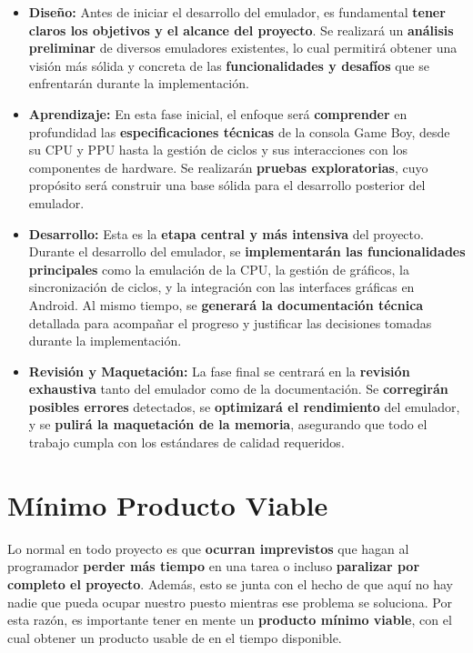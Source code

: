 \begin{itemize}
	\item \textbf{Diseño:} Antes de iniciar el desarrollo del emulador, es fundamental \textbf{tener claros los objetivos y el alcance del proyecto}. Se realizará un \textbf{análisis preliminar} de diversos emuladores existentes, lo cual permitirá obtener una visión más sólida y concreta de las \textbf{funcionalidades y desafíos} que se enfrentarán durante la implementación.

	\item \textbf{Aprendizaje:} En esta fase inicial, el enfoque será \textbf{comprender} en profundidad las \textbf{especificaciones técnicas} de la consola Game Boy, desde su CPU y PPU hasta la gestión de ciclos y sus interacciones con los componentes de hardware. Se realizarán \textbf{pruebas exploratorias}, cuyo propósito será construir una base sólida para el desarrollo posterior del emulador.
	
	\item \textbf{Desarrollo:} Esta es la \textbf{etapa central y más intensiva} del proyecto. Durante el desarrollo del emulador, se \textbf{implementarán las funcionalidades principales} como la emulación de la CPU, la gestión de gráficos, la sincronización de ciclos, y la integración con las interfaces gráficas en Android. Al mismo tiempo, se \textbf{generará la documentación técnica} detallada para acompañar el progreso y justificar las decisiones tomadas durante la implementación.
	
	\item \textbf{Revisión y Maquetación:} La fase final se centrará en la \textbf{revisión exhaustiva} tanto del emulador como de la documentación. Se \textbf{corregirán posibles errores} detectados, se \textbf{optimizará el rendimiento} del emulador, y se \textbf{pulirá la maquetación de la memoria}, asegurando que todo el trabajo cumpla con los estándares de calidad requeridos.
	
\end{itemize}
	
\section{Mínimo Producto Viable}

Lo normal en todo proyecto es que \textbf{ocurran imprevistos} que hagan al programador \textbf{perder más tiempo} en una tarea o incluso \textbf{paralizar por completo el proyecto}. Además, esto se junta con el hecho de que aquí no hay nadie que pueda ocupar nuestro puesto mientras ese problema se soluciona. Por esta razón, es importante tener en mente un \textbf{producto mínimo viable}, con el cual obtener un producto usable de en el tiempo disponible.


